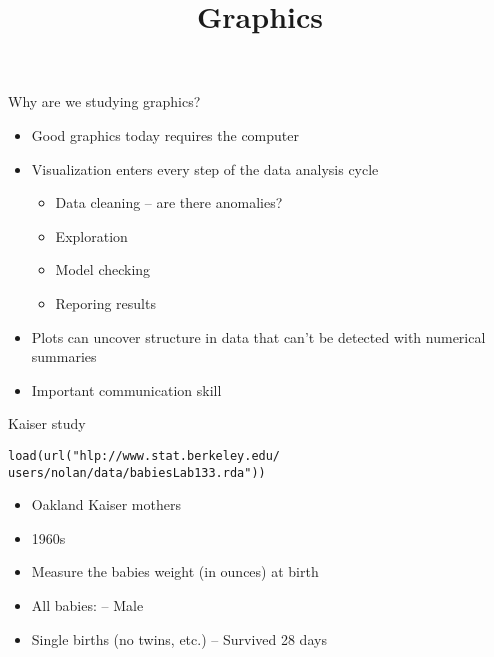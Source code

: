 \documentclass{beamer}\usepackage[]{graphicx}\usepackage[]{color}
\makeatletter
\newenvironment{kframe}{%
 \def\at@end@of@kframe{}%
 \ifinner\ifhmode%
  \def\at@end@of@kframe{\end{minipage}}%
  \begin{minipage}{\columnwidth}%
 \fi\fi%
 \def\FrameCommand##1{\hskip\@totalleftmargin \hskip-\fboxsep
 \colorbox{shadecolor}{##1}\hskip-\fboxsep
     \hskip-\linewidth \hskip-\@totalleftmargin \hskip\columnwidth}%
 \MakeFramed {\advance\hsize-\width
   \@totalleftmargin\z@ \linewidth\hsize
   \@setminipage}}%
 {\par\unskip\endMakeFramed%
 \at@end@of@kframe}
\newenvironment{knitrout}{}{} %
\renewenvironment{knitrout}{\begin{singlespace}}{\end{singlespace}}
\theoremstyle{mystyle}
\makeatother
\begin{document}

\title{
Graphics 
}
\author{
}
\date{}

\begin{frame}[fragile]
\titlepage
\end{frame}

\begin{frame}[fragile]{Why are we studying graphics?}
\begin{itemize}
\item Good graphics today requires the computer
\item Visualization enters every step of the data analysis cycle
\begin{itemize}
\item Data cleaning – are there anomalies?
\item Exploration
\item Model checking
\item Reporing results
\end{itemize}
\item Plots can uncover structure in data that can’t be detected with numerical summaries
\item Important communication skill
\end{itemize}
\end{frame}

\begin{frame}[fragile]{Kaiser study}
 \begin{knitrout}
 \color{fgcolor}\begin{kframe}
 \begin{alltt}
load(url("hlp://www.stat.berkeley.edu/ 
users/nolan/data/babiesLab133.rda")) 
 \end{alltt}
 \end{kframe}
 \end{knitrout}
\begin{itemize}
\item Oakland Kaiser mothers
\item 1960s
\item Measure the babies weight (in ounces) at birth
\item All babies: –  Male
\item Single births (no twins, etc.) – Survived 28 days
\end{itemize}
\end{frame}
\end{document}
